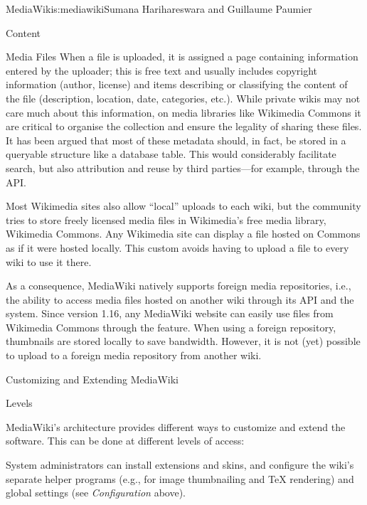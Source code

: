 \begin{aosachapter}{MediaWiki}{s:mediawiki}{Sumana Harihareswara and Guillaume Paumier}
\begin{aosasect1}{Content}
\begin{aosasect2}{Media Files}
When a file is uploaded, it is assigned a  page containing
information entered by the uploader; this is free text and usually
includes copyright information (author, license) and items describing
or classifying the content of the file (description, location, date,
categories, etc.). While private wikis may not care much about this
information, on media libraries like Wikimedia Commons it are
critical to organise the collection and ensure the legality of sharing
these files. It has been argued that most of these metadata should, in
fact, be stored in a queryable structure like a database table. This
would considerably facilitate search, but also attribution and reuse
by third parties---for example, through the API.

Most Wikimedia sites also allow ``local'' uploads to each wiki, but the
community tries to store freely licensed media files in Wikimedia's
free media library, Wikimedia Commons. Any Wikimedia site can display
a file hosted on Commons as if it were hosted locally. This custom
avoids having to upload a file to every wiki to use it there.

As a consequence, MediaWiki natively supports foreign media
repositories, i.e., the ability to access media files hosted on
another wiki through its API and the 
system. Since version 1.16, any MediaWiki website can easily use files
from Wikimedia Commons through the  feature. When
using a foreign repository, thumbnails are stored locally to save
bandwidth. However, it is not (yet) possible to upload to a foreign
media repository from another wiki.

\end{aosasect2}

\end{aosasect1}

\begin{aosasect1}{Customizing and Extending MediaWiki}

\begin{aosasect2}{Levels}

MediaWiki's architecture provides different ways to customize and
extend the software. This can be done at different levels of access:

\begin{aosaitemize}

\item System administrators can install extensions and skins, and
  configure the wiki's separate helper programs (e.g., for image
  thumbnailing and TeX rendering) and global settings (see
  \emph{Configuration} above).


\end{aosaitemize}
\end{aosasect2}
\end{aosasect1}
\end{aosachapter}

